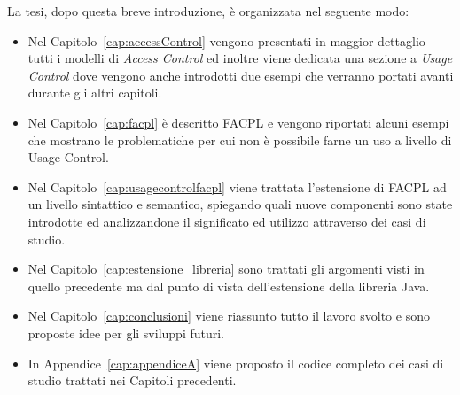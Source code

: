 La tesi, dopo questa breve introduzione, è organizzata nel seguente modo: 
\begin{itemize}
\item Nel Capitolo~\ref{cap:accessControl} vengono
presentati in maggior dettaglio tutti i modelli di \textit{Access Control} ed inoltre viene dedicata una sezione a \textit{Usage Control}
dove vengono anche introdotti due esempi che verranno portati avanti
durante gli altri capitoli.
\item Nel Capitolo~\ref{cap:facpl} è descritto \ac{FACPL} e vengono riportati alcuni esempi che mostrano le problematiche per cui non è possibile farne un uso a livello di Usage Control.
\item Nel Capitolo~\ref{cap:usagecontrolfacpl} viene trattata l’estensione di \ac{FACPL} ad un livello sintattico
e semantico, spiegando quali nuove componenti sono state introdotte ed
analizzandone il significato ed utilizzo attraverso dei casi di studio.
\item Nel Capitolo~\ref{cap:estensione_libreria} sono trattati gli argomenti
visti in quello precedente ma dal punto di vista dell’estensione della
libreria Java.
\item Nel Capitolo~\ref{cap:conclusioni} viene riassunto tutto il lavoro svolto e sono proposte idee per gli sviluppi futuri.

\item In Appendice~\ref{cap:appendiceA} viene proposto il codice completo dei casi di studio trattati nei Capitoli precedenti.
\end{itemize}
